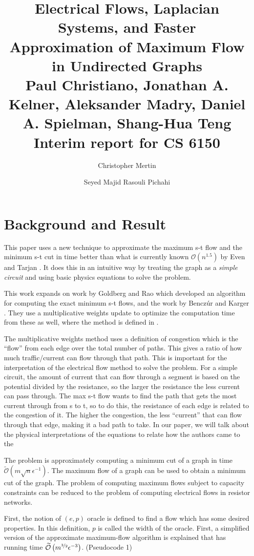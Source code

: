 \documentclass[11pt]{article}
\title{Electrical Flows, Laplacian Systems, and Faster Approximation of Maximum Flow in Undirected Graphs\\Paul Christiano, Jonathan A. Kelner, Aleksander Madry, Daniel A. Spielman, Shang-Hua Teng\\Interim report for CS 6150}
\author{Christopher Mertin \and Seyed Majid Rasouli Pichahi}
\begin{document}
\maketitle

\section{Background and Result}
\label{sec:background}

This paper uses a new technique to approximate the maximum s-t flow and the minimum s-t cut in time better than what is currently known $\mathcal{O}\left( n^{1.5}\right)$  by Even and Tarjan \cite{Even}. It does this in an intuitive way by treating the graph as a {\em simple circuit} and using basic physics equations to solve the problem.

This work expands on work by Goldberg and Rao \cite{Goldberg} which developed an algorithm for computing the exact minimum s-t flows, and the work by Bencz\'{u}r and Karger \cite{Benczur}. They use a multiplicative weights update to optimize the computation time from these as well, where the method is defined in \cite{Arora, Plotkin}. 

The multiplicative weights method uses a definition of congestion which is the “flow” from each edge over the total number of paths. This gives a ratio of how much traffic/current can flow through that path. This is important for the interpretation of the electrical flow method to solve the problem. For a simple circuit, the amount of current that can flow through a segment is based on the potential divided by the resistance, so the larger the resistance the less current can pass through. The max s-t flow wants to find the path that gets the most current through from s to t, so to do this, the resistance of each edge is related to the congestion of it. The higher the congestion, the less “current” that can flow through that edge, making it a bad path to take. In our paper, we will talk about the physical interpretations of the equations to relate how the authors came to the 

The problem is approximately computing a minimum cut of a graph in time $\widetilde{\mathcal{O}}\left( m\sqrt{n}\epsilon^{-1}\right)$. The maximum flow of a graph can be used to obtain a minimum cut of the graph. The problem of computing maximum flows subject to capacity constraints can be reduced to the problem of computing electrical flows in resistor networks. 

First, the notion of $(e,p)$ oracle is defined to find a flow which has some desired properties. In this definition, $p$ is called the width of the oracle. First, a simplified version of the approximate maximum-flow algorithm is explained that has running time $\widetilde{\mathcal{O}}\left( m^{\unitfrac{3}{2}} \epsilon^{-3}\right)$. (Pseudocode 1)
\end{document}
